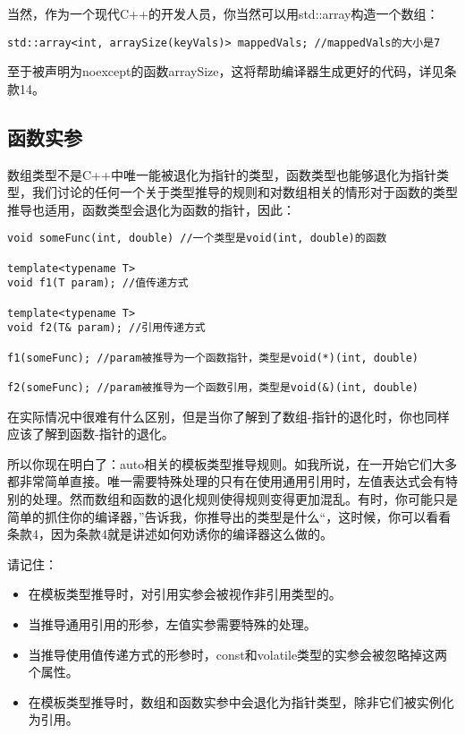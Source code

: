 当然，作为一个现代C++的开发人员，你当然可以用std::array构造一个数组：

\begin{lstlisting}
std::array<int, arraySize(keyVals)> mappedVals; //mappedVals的大小是7
\end{lstlisting}

至于被声明为noexcept的函数arraySize，这将帮助编译器生成更好的代码，详见条款14。

\subsection*{函数实参}
数组类型不是C++中唯一能被退化为指针的类型，函数类型也能够退化为指针类型，我们讨论的任何一个关于类型推导的规则和对数组相关的情形对于函数的类型推导也适用，函数类型会退化为函数的指针，因此：

\begin{lstlisting}
void someFunc(int, double) //一个类型是void(int, double)的函数

template<typename T>
void f1(T param); //值传递方式

template<typename T>
void f2(T& param); //引用传递方式

f1(someFunc); //param被推导为一个函数指针，类型是void(*)(int, double)

f2(someFunc); //param被推导为一个函数引用，类型是void(&)(int, double)
\end{lstlisting}

在实际情况中很难有什么区别，但是当你了解到了数组-指针的退化时，你也同样应该了解到函数-指针的退化。

所以你现在明白了：auto相关的模板类型推导规则。如我所说，在一开始它们大多都非常简单直接。唯一需要特殊处理的只有在使用通用引用时，左值表达式会有特别的处理。然而数组和函数的退化规则使得规则变得更加混乱。有时，你可能只是简单的抓住你的编译器，”告诉我，你推导出的类型是什么“，这时候，你可以看看条款4，因为条款4就是讲述如何劝诱你的编译器这么做的。

\begin{mdframed}
请记住：
\begin{itemize}
\item{在模板类型推导时，对引用实参会被视作非引用类型的。} 
\item{当推导通用引用的形参，左值实参需要特殊的处理。}
\item{当推导使用值传递方式的形参时，const和volatile类型的实参会被忽略掉这两个属性。}
\item{在模板类型推导时，数组和函数实参中会退化为指针类型，除非它们被实例化为引用。}
\end{itemize}
\end{mdframed}

